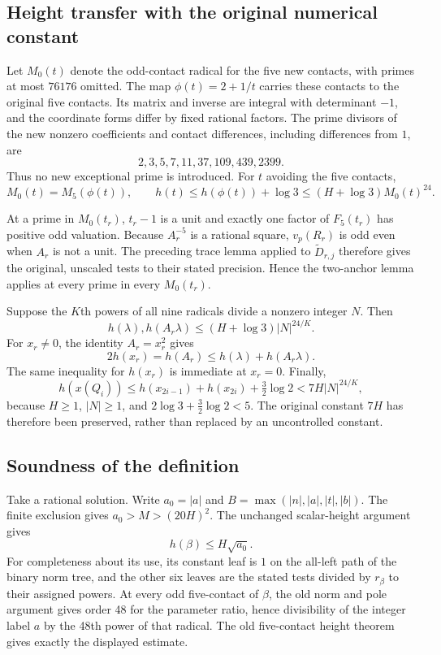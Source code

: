 \documentclass[11pt]{article}
\theoremstyle{definition}
\begin{document}
\subsection{Height transfer with the original numerical constant}
Let $M_0(t)$ denote the odd-contact radical for the five new contacts,
with primes at most $76176$ omitted. The map $\phi(t)=2+1/t$ carries
these contacts to the original five contacts. Its matrix and inverse
are integral with determinant $-1$, and the coordinate forms differ
by fixed rational factors. The prime divisors of the new nonzero
coefficients and contact differences, including differences from $1$,
are
\[
 2,3,5,7,11,37,109,439,2399.
\]
Thus no new exceptional prime is introduced. For $t$ avoiding the
five contacts,
\[
 M_0(t)=M_5(\phi(t)),\qquad
 h(t)\le h(\phi(t))+\log3
       \le(H+\log3)M_0(t)^{24}.
\]

At a prime in $M_0(t_r)$, $t_r-1$ is a unit and exactly one factor
of $F_5(t_r)$ has positive odd valuation. Because $A_r^{-5}$ is a
rational square, $v_p(R_r)$ is odd even when $A_r$ is not a unit.
The preceding trace lemma applied to $\widetilde D_{r,j}$ therefore
gives the original, unscaled tests to their stated precision. Hence
the two-anchor lemma applies at every prime in every $M_0(t_r)$.

Suppose the $K$th powers of all nine radicals divide a nonzero integer
$N$. Then
\[
 h(\lambda),h(A_r\lambda)
 \le(H+\log3)|N|^{24/K}.
\]
For $x_r\ne0$, the identity $A_r=x_r^2$ gives
\[
 2h(x_r)=h(A_r)\le h(\lambda)+h(A_r\lambda).
\]
The same inequality for $h(x_r)$ is immediate at $x_r=0$. Finally,
\[
 h(x(Q_i))\le h(x_{2i-1})+h(x_{2i})+\tfrac32\log2
 <7H|N|^{24/K},
\]
because $H\ge1$, $|N|\ge1$, and $2\log3+\tfrac32\log2<5$.
The original constant $7H$ has therefore been preserved, rather than
replaced by an uncontrolled constant.

\subsection{Soundness of the definition}
Take a rational solution. Write $a_0=|a|$ and
$B=\max(|n|,|a|,|t|,|b|)$. The finite exclusion gives
$a_0>M>(20H)^2$. The unchanged scalar-height argument gives
\[
 h(\beta)\le H\sqrt{a_0}.
\]
For completeness about its use, its constant leaf is $1$ on the
all-left path of the binary norm tree, and the other six leaves are
the stated tests divided by $r_\beta$ to their assigned powers.
At every odd five-contact of $\beta$, the old norm and pole argument
gives order 48 for the parameter ratio, hence divisibility of the
integer label $a$ by the 48th power of that radical. The old
five-contact height theorem gives exactly the displayed estimate.
\end{document}
